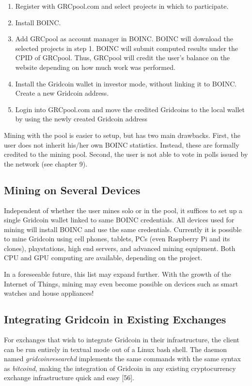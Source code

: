 \begin{enumerate}
  \item Register with GRCpool.com and select projects in which to participate.
  \item Install BOINC.
  \item Add GRCpool as account manager in BOINC. BOINC will download the selected projects in step 1. BOINC will submit computed results under the CPID of GRCpool. Thus, GRCpool will credit the user's balance on the website depending on how much work was performed. 
  \item Install the Gridcoin wallet in investor mode, without linking it to BOINC. Create a new Gridcoin address.
  \item Login into GRCpool.com and move the credited Gridcoins to the local wallet by using the newly created Gridcoin address
\end{enumerate}

Mining with the pool is easier to setup, but has two main drawbacks. First, the user does not inherit his/her own BOINC statistics. Instead, these are formally credited to the mining pool. Second, the user is not able to vote in polls issued by the network (see chapter 9).

\subsection{Mining on Several Devices}

Independent of whether the user mines solo or in the pool, it suffices to set up a single Gridcoin wallet linked to same BOINC credentials. All devices used for mining will install BOINC and use the same credentials. Currently it is possible to mine Gridcoin using cell phones, tablets, PCs (even Raspberry Pi and its clones), playstations, high end servers, and advanced mining equipment. Both CPU and GPU computing are available, depending on the project.

In a foreseeable future, this list may expand further. With the growth of the Internet of Things, mining may even become possible on devices such as smart watches and house appliances! 

\subsection{Integrating Gridcoin in Existing Exchanges}

For exchanges that wish to integrate Gridcoin in their infrastructure, the client can be run entirely in textual mode out of a Linux bash shell. The daemon named \textit{gridcoinresearchd} implements the same commands with the same syntax as \textit{bitcoind}, making the integration of Gridcoin in any existing cryptocurrency exchange infrastructure quick and easy [56].\\
